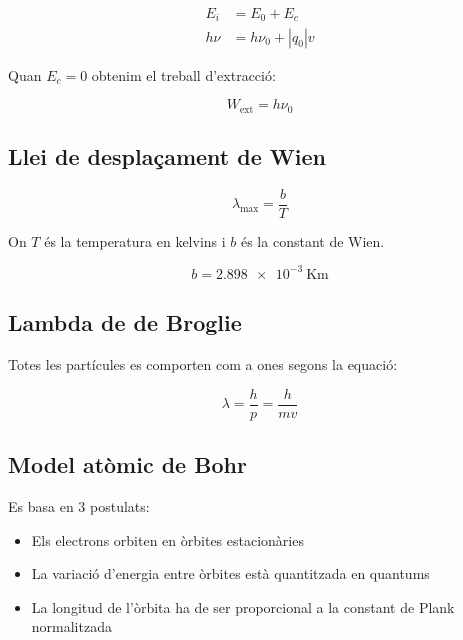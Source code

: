\begin{align}
    E_i &= E_0 + E_c \\
    h\nu &= h\nu_0 + |q_0|v
\end{align}

Quan $E_c = 0$ obtenim el treball d'extracció:

\begin{equation}
    W_\text{ext} = h\nu_0
\end{equation}

\subsection{Llei de desplaçament de Wien}
\label{sub:llei_de_desplacament_de_wien}

\begin{equation}
    \lambda_\text{max} = \frac{b}{T}
\end{equation}

On $T$ és la temperatura en kelvins i $b$ és la constant de Wien.

\begin{equation}
    b = \SI{2.898e-3}{\kelvin\metre}
\end{equation}

\subsection{Lambda de de Broglie}
\label{sub:lambda_de_de_broglie}

Totes les partícules es comporten com a ones segons la equació:

\begin{equation}
    \lambda = \frac{h}{p} = \frac{h}{mv}
\end{equation}

\pagebreak

\subsection{Model atòmic de Bohr}
\label{sub:model_atomic_de_bohr}

Es basa en 3 postulats:

\begin{itemize}
    \item Els electrons orbiten en òrbites estacionàries
    \item La variació d'energia entre òrbites està quantitzada en quantums
    \item La longitud de l'òrbita ha de ser proporcional a la constant de Plank
        normalitzada
\end{itemize}

